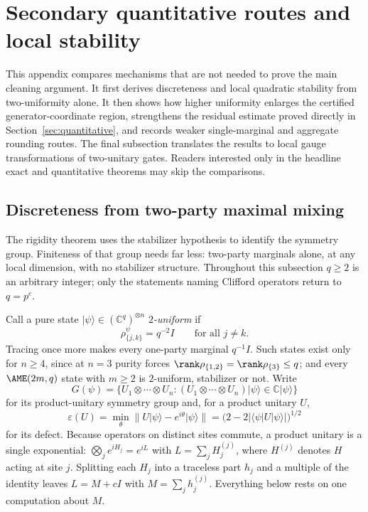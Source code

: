 \section{Secondary quantitative routes and local stability}
\label{sec:two-uniform}

This appendix compares mechanisms that are not needed to prove the main
cleaning argument.  It first derives discreteness and local quadratic
stability from two-uniformity alone.  It then shows how higher uniformity
enlarges the certified generator-coordinate region, strengthens the residual
estimate proved directly in Section~\ref{sec:quantitative}, and
records weaker single-marginal and aggregate rounding routes.  The final
subsection translates the results to local gauge transformations of
two-unitary gates.  Readers interested only in the headline exact and
quantitative theorems may skip the comparisons.

\subsection{Discreteness from two-party maximal mixing}

The rigidity theorem uses the stabilizer hypothesis to identify the
symmetry group.  Finiteness of that group needs far less: two-party
marginals alone, at any local dimension, with no stabilizer structure.
Throughout this subsection \(q\geq2\) is an arbitrary integer; only the
statements naming Clifford operators return to \(q=p^e\).

Call a pure state
\(\lvert\psi\rangle\in(\mathbb C^q)^{\otimes n}\) \emph{\(2\)-uniform} if
\[
 \rho^\psi_{\{j,k\}}=q^{-2}I\qquad\text{for all }j\ne k .
\]
Tracing once more makes every one-party marginal \(q^{-1}I\).  Such states
exist only for \(n\geq4\), since at \(n=3\) purity forces
\(\rank\rho_{\{1,2\}}=\rank\rho_{\{3\}}\leq q\); and every
\(\AME(2m,q)\) state with \(m\geq2\) is \(2\)-uniform, stabilizer or not.
Write
\[
 G(\psi)=\{U_1\otimes\cdots\otimes U_n:
   (U_1\otimes\cdots\otimes U_n)\lvert\psi\rangle
     \in\mathbb C\lvert\psi\rangle\}
\]
for its product-unitary symmetry group and, for a product unitary \(U\),
\[
 \varepsilon(U)=\min_\theta\bigl\lVert U\lvert\psi\rangle
    -e^{i\theta}\lvert\psi\rangle\bigr\rVert
  =\bigl(2-2\lvert\langle\psi\rvert U\lvert\psi\rangle\rvert
   \bigr)^{1/2}
\]
for its defect.  Because operators on distinct sites commute, a product
unitary is a single exponential:
\(\bigotimes_je^{iH_j}=e^{iL}\) with \(L=\sum_jH_j^{(j)}\), where
\(H^{(j)}\) denotes \(H\) acting at site \(j\).  Splitting each \(H_j\)
into a traceless part \(h_j\) and a multiple of the identity leaves
\(L=M+cI\) with \(M=\sum_jh_j^{(j)}\).  Everything below rests on one
computation about \(M\).

